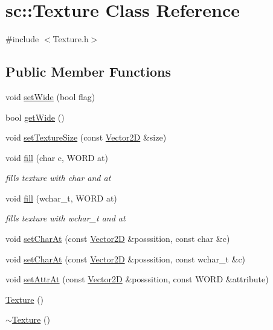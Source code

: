\hypertarget{classsc_1_1_texture}{}\section{sc\+::Texture Class Reference}
\label{classsc_1_1_texture}


{\ttfamily \#include $<$Texture.\+h$>$}

\subsection*{Public Member Functions}
\begin{DoxyCompactItemize}
\item 
void \mbox{\hyperlink{classsc_1_1_texture_a6af63789fe385517d20bc8b5c96625ec}{set\+Wide}} (bool flag)
\item 
bool \mbox{\hyperlink{classsc_1_1_texture_ae9df5b705a4395c9004022dead98cf19}{get\+Wide}} ()
\item 
void \mbox{\hyperlink{classsc_1_1_texture_a7ce69837e8f50b04dba087bee7bf74fe}{set\+Texture\+Size}} (const \mbox{\hyperlink{classsc_1_1_vector2_d}{Vector2D}} \&size)
\item 
void \mbox{\hyperlink{classsc_1_1_texture_abe2c73b9e910cd8df9a6544bf6acdbd2}{fill}} (char c, W\+O\+RD at)
\begin{DoxyCompactList}\small\item\em fills texture with char and at \end{DoxyCompactList}\item 
void \mbox{\hyperlink{classsc_1_1_texture_a5df48dc70b5ffec2507c94a9af941e29}{fill}} (wchar\+\_\+t, W\+O\+RD at)
\begin{DoxyCompactList}\small\item\em fills texture with wchar\+\_\+t and at \end{DoxyCompactList}\item 
void \mbox{\hyperlink{classsc_1_1_texture_ad1d266797c9546b642479c875a6800c6}{set\+Char\+At}} (const \mbox{\hyperlink{classsc_1_1_vector2_d}{Vector2D}} \&posssition, const char \&c)
\item 
void \mbox{\hyperlink{classsc_1_1_texture_a98f9795abab95f2e99fa8a22d4d13a7b}{set\+Char\+At}} (const \mbox{\hyperlink{classsc_1_1_vector2_d}{Vector2D}} \&posssition, const wchar\+\_\+t \&c)
\item 
void \mbox{\hyperlink{classsc_1_1_texture_ad66375bc4380afdb3949c336bb8e66ac}{set\+Attr\+At}} (const \mbox{\hyperlink{classsc_1_1_vector2_d}{Vector2D}} \&posssition, const W\+O\+RD \&attribute)
\item 
\mbox{\hyperlink{classsc_1_1_texture_a6c275e3f186675ff6ed73ccf970e552f}{Texture}} ()
\item 
\mbox{\hyperlink{classsc_1_1_texture_a09c4bcb7462f64c1d20fa69dba3cee8a}{$\sim$\+Texture}} ()
\end{DoxyCompactItemize}
